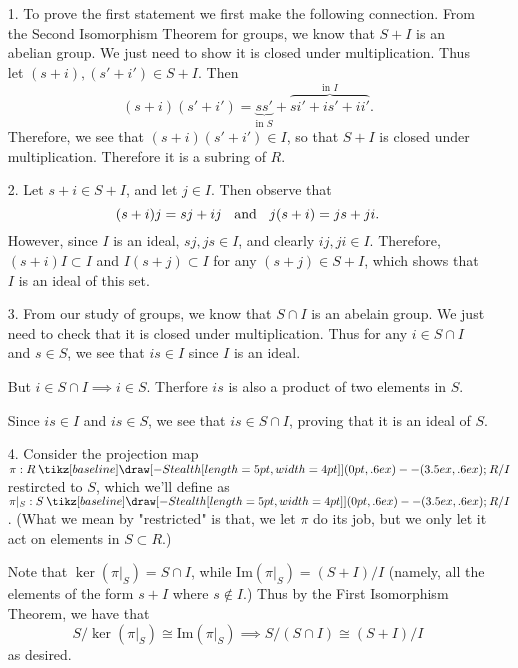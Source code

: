 \documentclass[12pt,letterpaper]{algebra_book}
\renewcommand{\to}{\mathbin{\tikz[baseline] \draw[-{Stealth[length=5pt,width=4pt]}] (0pt,.6ex) -- (3.5ex,.6ex);}}
\newcommand{\im}{\mbox{Im}}
\theoremstyle{definition}
\begin{document}
    \begin{prf}
        \begin{itemize}
            \item[1.] To prove the first statement we first make
            the following connection. From the Second Isomorphism
            Theorem for groups, we know that $S + I$ is an abelian
            group. We just need to show it is closed under
            multiplication. Thus let $(s + i), (s' + i') \in S +
            I$. Then 
            \[
                (s + i)(s' + i') = \underbrace{ss'}_{\text{in }S} + \overbrace{si' + is' + ii'}^{\text{in } I}.
            \]
            Therefore, we see that $(s + i)(s' + i') \in I$, so
            that $S + I$ is closed under multiplication. Therefore
            it is a subring of $R$. 

            \item[2.] Let $s + i \in S + I$, and let $j \in I$. Then observe that 
            \[
                (s + i)j = sj + ij \hspace{0.2cm}\text{ and }\hspace{0.2cm} j(s + i) = js + ji.
            \] 
            However, since $I$ is an ideal, $sj, js \in I$, and
            clearly $ij, ji \in I$. Therefore, $(s + i)I \subset
            I$ and $I(s + j) \subset I$ for any $(s + j) \in S +
            I$, which shows that $I$ is an ideal of this set.
            
            \item[3.] From our study of groups, we know that $S
            \cap I$ is an abelain group. We just need to check
            that it is closed under multiplication. Thus for any
            $i \in S \cap I$ and $s \in S$, we see that $is \in I$
            since $I$ is an ideal. 
            
            But $i \in S \cap I \implies i
            \in S$. Therfore $is$ is also a product of two
            elements in $S$.

            Since $is \in I$ and $is \in S$, we see that $is \in S
            \cap I$, proving that it is an ideal of $S$.

            \item[4.] Consider the projection map $\pi: R \to R/I$
            restircted to $S$, which we'll define as $\pi|_S : S
            \to R/I$. (What we mean by "restricted" is that, we
            let $\pi$ do its job, but we only let it act on
            elements in $S \subset R$.)

            Note that $\ker(\pi|_S) = S \cap I$, while
            $\im(\pi|_S) = (S + I)/I$ (namely, all the elements of
            the form $s + I$ where $s \not\in I$.) Thus by the
            First Isomorphism Theorem, we have that 
            \[
                S/\ker(\pi|_S) \cong \im(\pi|_S)  
                \implies S/(S \cap I) \cong (S + I)/I 
            \]
            as desired.
        \end{itemize}
    \end{prf}
\end{document}
